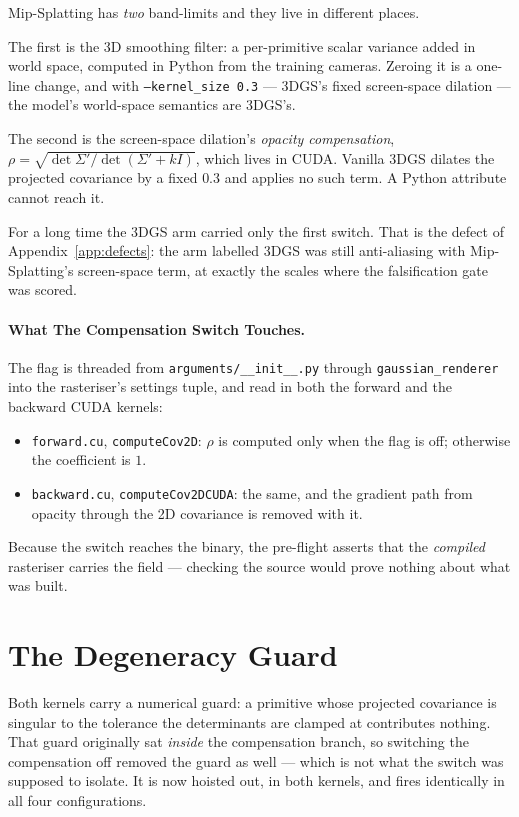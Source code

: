 Mip-Splatting has \emph{two} band-limits and they live in different places.

The first is the 3D smoothing filter: a per-primitive scalar variance added in
world space, computed in Python from the training cameras. Zeroing it is a
one-line change, and with \texttt{--kernel\_size 0.3} --- 3DGS's fixed screen-space
dilation --- the model's world-space semantics are 3DGS's.

The second is the screen-space dilation's \emph{opacity compensation},
$\rho = \sqrt{\det \Sigma' / \det(\Sigma' + kI)}$, which lives in CUDA. Vanilla
3DGS dilates the projected covariance by a fixed $0.3$ and applies no such term.
A Python attribute cannot reach it.

For a long time the 3DGS arm carried only the first switch. That is the defect of
Appendix~\ref{app:defects}: the arm labelled 3DGS was still anti-aliasing with
Mip-Splatting's screen-space term, at exactly the scales where the falsification
gate was scored.

\paragraph{What The Compensation Switch Touches.} The flag is
threaded from \texttt{arguments/\allowbreak\_\_init\_\_.py} through
\texttt{gaussian\_renderer} into the rasteriser's settings tuple, and read in
both the forward and the backward CUDA kernels:

\begin{itemize}[leftmargin=1.4em,itemsep=2pt]
  \item \texttt{forward.cu}, \texttt{computeCov2D}: $\rho$ is computed only when
        the flag is off; otherwise the coefficient is $1$.
  \item \texttt{backward.cu}, \texttt{computeCov2DCUDA}: the same, and the
        gradient path from opacity through the 2D covariance is removed with it.
\end{itemize}

Because the switch reaches the binary, the pre-flight asserts that the
\emph{compiled} rasteriser carries the field --- checking the source would prove
nothing about what was built.

\section{The Degeneracy Guard}

Both kernels carry a numerical guard: a primitive whose projected covariance is
singular to the tolerance the determinants are clamped at contributes nothing.
That guard originally sat \emph{inside} the compensation branch, so switching the
compensation off removed the guard as well --- which is not what the switch was
supposed to isolate. It is now hoisted out, in both kernels, and fires
identically in all four configurations.


